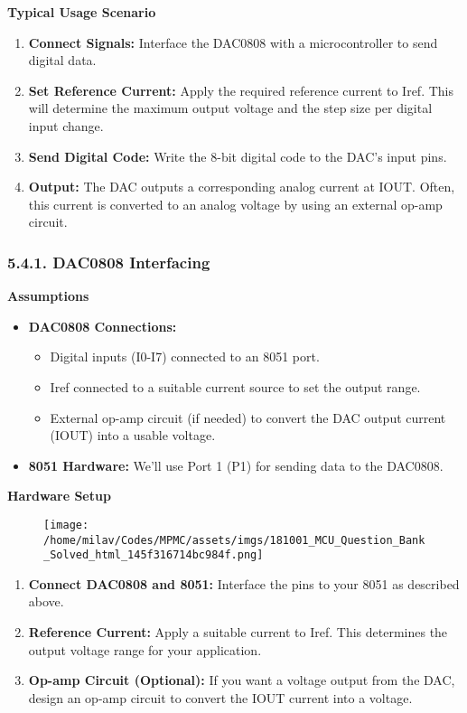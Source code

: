 \documentclass[
]{article}
\begin{document}
\textbf{Typical Usage Scenario}

\begin{enumerate}
\def\labelenumi{\arabic{enumi}.}
\item
  \textbf{Connect Signals:} Interface the DAC0808 with a microcontroller
  to send digital data.
\item
  \textbf{Set Reference Current:} Apply the required reference current
  to Iref. This will determine the maximum output voltage and the step
  size per digital input change.
\item
  \textbf{Send Digital Code:} Write the 8-bit digital code to the DAC's
  input pins.
\item
  \textbf{Output:} The DAC outputs a corresponding analog current at
  IOUT. Often, this current is converted to an analog voltage by using
  an external op-amp circuit.
\end{enumerate}

\hypertarget{541-dac0808-interfacing}{%
\subsubsection{5.4.1. DAC0808
Interfacing}\label{541-dac0808-interfacing}}

\textbf{Assumptions}

\begin{itemize}
\item
  \textbf{DAC0808 Connections:}

  \begin{itemize}
  \item
    Digital inputs (I0-I7) connected to an 8051 port.
  \item
    Iref connected to a suitable current source to set the output range.
  \item
    External op-amp circuit (if needed) to convert the DAC output
    current (IOUT) into a usable voltage.
  \end{itemize}
\item
  \textbf{8051 Hardware:} We'll use Port 1 (P1) for sending data to the
  DAC0808.
\end{itemize}

\textbf{Hardware Setup}

\begin{figure}
\centering
\texttt{[image: /home/milav/Codes/MPMC/assets/imgs/181001\_MCU\_Question\_Bank\_Solved\_html\_145f316714bc984f.png]}
\caption{}
\end{figure}

\begin{enumerate}
\def\labelenumi{\arabic{enumi}.}
\item
  \textbf{Connect DAC0808 and 8051:} Interface the pins to your 8051 as
  described above.
\item
  \textbf{Reference Current:} Apply a suitable current to Iref. This
  determines the output voltage range for your application.
\item
  \textbf{Op-amp Circuit (Optional):} If you want a voltage output from
  the DAC, design an op-amp circuit to convert the IOUT current into a
  voltage.
\end{enumerate}
\end{document}
